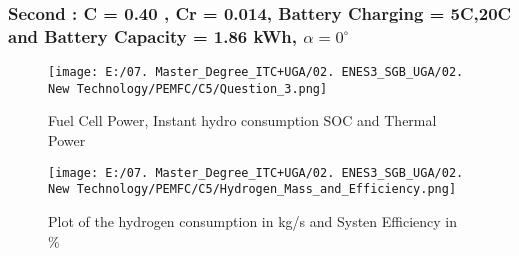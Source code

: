 \documentclass[12pt,a4paper]{article}
\numberwithin{equation}{section}
\begin{document}
\subsubsection{Second : C = 0.40 , Cr = 0.014, Battery Charging = 5C,20C and Battery Capacity = 1.86 kWh, $ \alpha = 0^{\circ}$}
\begin{figure}[h]
	\centering 
	\texttt{[image: E:/07. Master\_Degree\_ITC+UGA/02. ENES3\_SGB\_UGA/02. New Technology/PEMFC/C5/Question\_3.png]}
	\caption{\small {Fuel Cell Power, Instant hydro consumption SOC and Thermal Power}}
	\label{29}
\end{figure}


\begin{figure}[h]
	\centering 
	\texttt{[image: E:/07. Master\_Degree\_ITC+UGA/02. ENES3\_SGB\_UGA/02. New Technology/PEMFC/C5/Hydrogen\_Mass\_and\_Efficiency.png]}
	\caption{\small {Plot of the hydrogen consumption in kg/s and Systen Efficiency in \%}}
	\label{30}
\end{figure}
\end{document}
